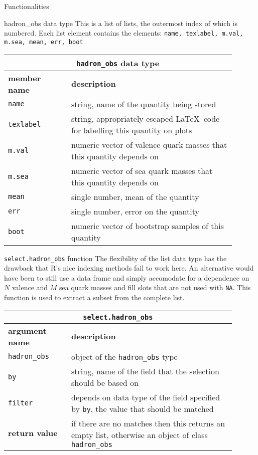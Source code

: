 \documentclass[10pt,a5paper]{article}
\begin{document}
\begin{section}{Functionalities}

\begin{subsection}{{\ttfamily hadron\_obs} data type}
This is a list of lists, the outermost index of which is numbered. Each list element contains the elements: {\tt name, texlabel, m.val, m.sea, mean, err, boot}

{ \centering
\begin{tabular}{|p{0.25\linewidth}|p{0.65\linewidth}|}
\hline
\multicolumn{2}{|c|}{ {\tt hadron\_obs} data type } \\
\hline \hline \textbf{member name} & \textbf{description} \\ \hline
{\tt name} & string, name of the quantity being stored \\ 
{\tt texlabel}  & string, appropriately escaped \LaTeX\, code for labelling this quantity on plots \\
{\tt m.val} & numeric vector of valence quark masses that this quantity depends on \\
{\tt m.sea} & numeric vector of sea quark masses that this quantity depends on \\
{\tt mean} & single number, mean of the quantity \\
{\tt err} & single number, error on the quantity \\
{\tt boot} & numeric vector of bootstrap samples of this quantity \\
\hline 
\end{tabular}
} %

\begin{subsubsection}{{\tt select.hadron\_obs} function}
The flexibility of the list data type has the drawback that R's nice indexing methods fail to work here.
An alternative would have been to still use a data frame and simply accomodate for a dependence on $N$ valence and $M$ sea quark masses and fill slots that are not used with {\tt NA}.
This function is used to extract a subset from the complete list.

{ \centering
\begin{tabular}{|p{0.25\linewidth}|p{0.65\linewidth}|}
\hline
\multicolumn{2}{|c|}{ {\tt select.hadron\_obs} } \\
\hline \hline \textbf{argument name} & \textbf{description} \\
\hline {\tt hadron\_obs} & object of the {\tt hadron\_obs} type \\ 
{\tt by} & string, name of the field that the selection should be based on \\ 
{\tt filter} & depends on data type of the field specified by {\tt by}, the value that should be matched \\ 
\hline \hline
\textbf{return value} & if there are no matches then this returns an empty list, otherwise an object of class {\tt hadron\_obs} \\
\hline
\end{tabular}
} %


\end{subsubsection}
\end{subsection}
\end{section}
\end{document}
